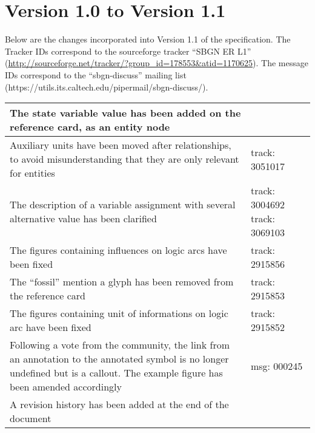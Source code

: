 \section{Version 1.0 to Version 1.1}

Below are the changes incorporated into Version 1.1 of the \SBGNERLone specification. The Tracker IDs correspond to the sourceforge tracker ``SBGN ER L1'' (\url{http://sourceforge.net/tracker/?group_id=178553&atid=1170625}). The message IDs correspond to the ``sbgn-discuss'' mailing list (https://utils.its.caltech.edu/pipermail/sbgn-discuss/).

\begin{center}
\label{tab:revision history 1.1}
\tablelasttail{\hline}
\begin{supertabular}{|p{0.75\textwidth}|p{0.25\textwidth}|}\hline
The state variable value has been added on the reference card, as an entity node & \\\hline
Auxiliary units have been moved after relationships, to avoid misunderstanding that they are only relevant for entities & track: 3051017\\\hline
The description of a variable assignment with several alternative value has been clarified & track: 3004692 \newline track: 3069103 \\\hline
The figures containing influences on logic arcs have been fixed & track: 2915856\\\hline
The ``fossil'' mention a glyph  has been removed from the reference card & track: 2915853\\\hline
The figures containing unit of informations on logic arc have been fixed &  track: 2915852 \\\hline
Following a vote from the community, the link from an annotation to the annotated symbol is no longer undefined but is a callout. The example figure has been amended accordingly & msg: 000245\\\hline
A revision history has been added at the end of the document& \\\hline
\end{supertabular}
\end{center}
